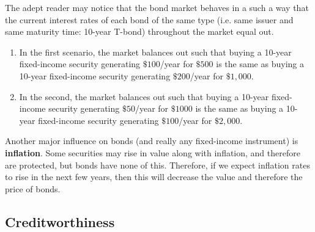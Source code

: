 \documentclass{article}
\begin{document}
    The adept reader may notice that the bond market behaves in a such a way that the current interest rates of each bond of the same type (i.e. same issuer and same maturity time: 10-year T-bond) throughout the market equal out.

    \begin{enumerate}
      \item In the first scenario, the market balances out such that buying a 10-year fixed-income security generating $\$100$/year for $\$500$ is the same as buying a 10-year fixed-income security generating $\$200$/year for $\$1,000$.
      \item In the second, the market balances out such that buying a 10-year fixed-income security generating $\$50$/year for $\$1000$ is the same as buying a 10-year fixed-income security generating $\$100$/year for $\$2,000$.
    \end{enumerate}

    Another major influence on bonds (and really any fixed-income instrument) is \textbf{inflation}. Some securities may rise in value along with inflation, and therefore are protected, but bonds have none of this. Therefore, if we expect inflation rates to rise in the next few years, then this will decrease the value and therefore the price of bonds.

  \subsection{Creditworthiness}
\end{document}
